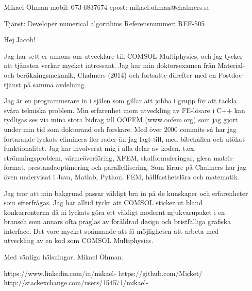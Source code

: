 \documentclass[a4paper,10pt]{article} %
\begin{document}
\pagestyle{empty} %




Mikael Öhman
mobil: 073-6837674  epost: mikael.ohman@chalmers.se

Tjänst: Developer numerical algorithms
Referensnummer: REF-505

Hej Jacob!

Jag har sett er annons om utvecklare till COMSOL Multiphysics, och jag tycker att tjänsten verkar mycket intressant.
Jag har min doktorsexamen från Material- och beräkningsmekanik, Chalmers (2014) och fortsatte därefter med en Postdoc-tjänst på samma avdelning.

Jag är en programmerare in i själen som gillar att jobba i grupp för att tackla svåra tekniska problem.
Min erfarenhet inom utveckling av FE-lösare i C++ kan tydligas ses via mina stora bidrag till OOFEM (www.oofem.org) som jag gjort under min tid som doktorand och forskare.
Med över 2000 commits så har jag fortarande lyckats eliminera fler rader än jag lagt till, med bibehållen och utökat funktionalitet.
Jag har involverat mig i alla delar av koden, t.ex. strömningsproblem, värmeöverföring, XFEM, skalformuleringar, glesa matris-format, prestandaoptimering och parallellisering.
Som lärare på Chalmers har jag även undervisat i Java, Matlab, Python, FEM, hållfasthetslära och matematik.

Jag tror att min bakgrund passar väldigt bra in på de kunskaper och erfarenheter som efterfrågas. Jag har alltid tyckt att COMSOL sticker ut bland konkurrenterna då ni lyckats göra ett väldigt modernt mjukvarupaket i en bransch som annars ofta präglas av föråldrad design och bristfälliga grafiska interface. Det vore mycket spännande att få möjligheten att arbeta med utveckling av en kod som COMSOL Multiphysics.

Med vänliga hälsningar, Mikael Öhman.

https://www.linkedin.com/in/mikael-%
https://github.com/Micket/
http://stackexchange.com/users/154571/mikael-%
\end{document}
